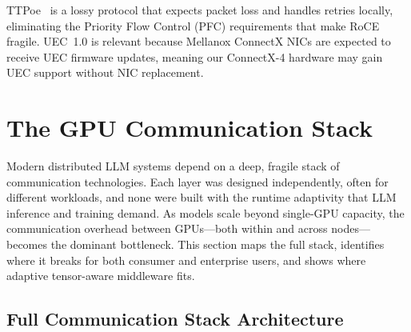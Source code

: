 \documentclass[11pt,letterpaper]{article}
\theoremstyle{definition}
\begin{document}
TTPoe~\cite{ttpoe-repo} is a lossy protocol that expects packet loss and handles retries locally, eliminating the Priority Flow Control (PFC) requirements that make RoCE fragile. UEC~1.0 is relevant because Mellanox ConnectX NICs are expected to receive UEC firmware updates, meaning our ConnectX-4 hardware may gain UEC support without NIC replacement.

\section{The GPU Communication Stack}
\label{sec:gpu-comm-stack}

Modern distributed LLM systems depend on a deep, fragile stack of communication technologies. Each layer was designed independently, often for different workloads, and none were built with the runtime adaptivity that LLM inference and training demand. As models scale beyond single-GPU capacity, the communication overhead between GPUs---both within and across nodes---becomes the dominant bottleneck. This section maps the full stack, identifies where it breaks for both consumer and enterprise users, and shows where adaptive tensor-aware middleware fits.

\subsection{Full Communication Stack Architecture}
\end{document}

